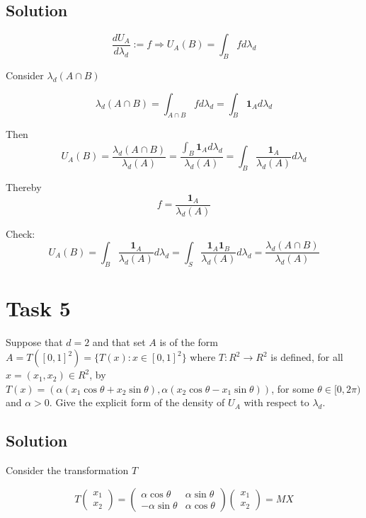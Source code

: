 \documentclass{article}
\begin{document}
\subsection*{Solution}

$$\frac{dU_A}{d\lambda_d} := f \Rightarrow U_A(B) = \int_B f d \lambda_d$$

Consider $\lambda_d(A\cap B)$

$$\lambda_d(A\cap B) = \int_{A\cap B}f d \lambda_d = \int_B \mathbf 1_A d \lambda_d$$

Then $$ U_A(B)= \frac{\lambda_d(A \cap B)}{\lambda_d(A)} = 
\frac{\int_B \mathbf 1_A d \lambda_d}{\lambda_d(A)} =
\int_B \frac{\mathbf 1_A}{\lambda_d(A)}d \lambda_d$$

Thereby 
$$f=\frac{\mathbf 1_A}{\lambda_d(A)}$$ 

Check: 
$$ U_A(B)=
\int_B \frac{\mathbf 1_A}{\lambda_d(A)}d \lambda_d = \int_S \frac{\mathbf 1_A \mathbf 1_B}{\lambda_d(A)}d \lambda_d = 
\frac{\lambda_d(A \cap B)}{\lambda_d(A)}$$

\section*{Task 5}

Suppose that $d = 2$ and that set $A$ is of the form $A = T([0, 1]^2) = \{T(x) : x \in [0, 1]^2\}$ where $T : R^2 \rightarrow R^2$ is defined, for all $x = (x_1, x_2) \in R^2$, by $T(x) = (\alpha(x_1 \cos \theta + x_2 \sin \theta), \alpha(x_2 \cos \theta - x_1 \sin \theta))$, for some $\theta \in [0, 2\pi)$ and $\alpha > 0$. Give the explicit form of the density of $U_A$ with respect to $\lambda_d$.

\subsection*{Solution}

Consider the transformation $T$

$$T
\begin{pmatrix}
    x_1\\
    x_2
\end{pmatrix} = 
\begin{pmatrix}
    \alpha \cos \theta & \alpha \sin \theta \\ 
    - \alpha \sin \theta & \alpha \cos \theta 
\end{pmatrix} 
\begin{pmatrix}
    x_1\\x_2
\end{pmatrix} = MX$$
\end{document}
